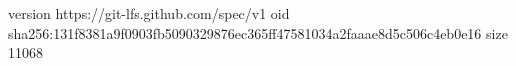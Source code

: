 version https://git-lfs.github.com/spec/v1
oid sha256:131f8381a9f0903fb5090329876ec365ff47581034a2faaae8d5c506c4eb0e16
size 11068
